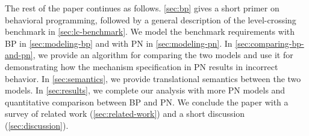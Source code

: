 \documentclass[10pt,journal,compsoc]{IEEEtran}
\theoremstyle{definition}
\begin{document}





The rest of the paper continues as follows. \autoref{sec:bp} gives a short primer on behavioral programming, followed by a general description of the level-crossing benchmark in \autoref{sec:lc-benchmark}. We model the benchmark requirements with BP in \autoref{sec:modeling-bp} and with PN in \autoref{sec:modeling-pn}. In \autoref{sec:comparing-bp-and-pn}, we provide an algorithm for comparing the two models and use it for demonstrating how the mechanism specification in PN results in incorrect behavior. In \autoref{sec:semantics}, we provide translational semantics between the two models. In \autoref{sec:results}, we complete our analysis with more PN models and quantitative comparison between BP and PN. We conclude the paper with a survey of related work (\autoref{sec:related-work}) and a short discussion (\autoref{sec:discussion}).
\end{document}
